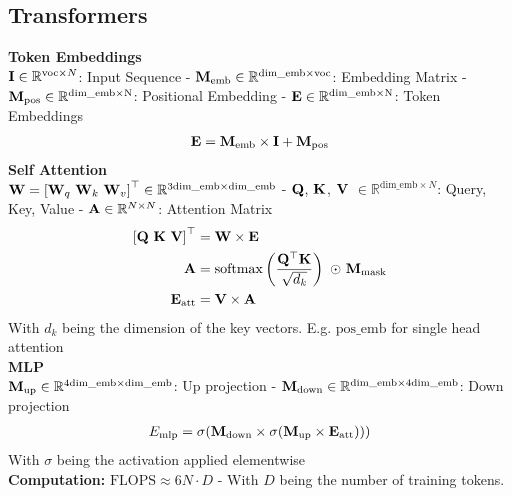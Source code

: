 \begin{multicols}{2}
    \section{Transformers}
    \begin{mdframed}[style=eqbox]
        \textbf{Token Embeddings}\\
        $\mathbf{I} \in \mathbb{R}^{\mathrm{voc}\times N}$: Input Sequence - $\mathbf{M_{\mathrm{emb}}} \in \mathbb{R}^{\mathrm{dim\_emb} \times \mathrm{voc}}$: Embedding Matrix - $\mathbf{M_{\mathrm{pos}}} \in \mathbb{R}^{\mathrm{dim\_emb} \times \mathrm{N}}$: Positional Embedding - $\mathbf{E} \in \mathbb{R}^{\mathrm{dim\_emb} \times \mathrm{N}}$: Token Embeddings
        \begin{align*}
            \mathbf{E} = \mathbf{M}_\mathrm{emb} \times \mathbf{I} + \mathbf{M}_\mathrm{pos}
        \end{align*}
        \textbf{Self Attention}\\
        $\mathbf{W} = \left[ \mathbf{W}_q ~ \mathbf{W}_k ~ \mathbf{W}_v \right]^\top \in \mathbb{R}^{3\mathrm{dim\_emb} \times \mathrm{dim\_emb}}$ - $\mathbf{Q}$, $\mathbf{K}$, $\mathbf{V}$ $\in \mathbb{R}^{\mathrm{dim\_emb} \times N}$: Query, Key, Value - $\mathbf{A} \in \mathbb{R}^{N \times N}$: Attention Matrix
        \begin{align*}
            \left[ \mat{Q} ~ \mat{K} ~ \mat{V} \right]^\top &= \mat{W} \times \mat{E}\\
            \mat{A} &= \operatorname{softmax}\left( \frac{\mat{Q}^\top \mat{K}}{\sqrt{d_k}}\right)~\astrosun~ \mat{M}_\mathrm{mask}\\
            \mat{E}_\mathrm{att} &= \mat{V} \times \mat{A}
        \end{align*}
        {\tiny With $d_k$ being the dimension of the key vectors. E.g. $\mathrm{pos\_emb}$ for single head attention}\\
        \textbf{MLP}\\
        $\mathbf{M}_\mathrm{up} \in \mathbb{R}^{4\mathrm{dim\_emb} \times \mathrm{dim\_emb}}$: Up projection - $\mathbf{M}_\mathrm{down} \in \mathbb{R}^{\mathrm{dim\_emb} \times 4\mathrm{dim\_emb}}$: Down projection
        \begin{align*}
            E_\mathrm{mlp} = \sigma(\mathbf{M}_\mathrm{down} \times \sigma (\mathbf{M}_\mathrm{up} \times \mathbf{E}_\mathrm{att})))
        \end{align*}
        {\tiny With $\sigma$ being the activation applied elementwise}\\
        \textbf{Computation:} $\mathrm{FLOPS} \approx 6N \cdot D$ - With $D$ being the number of training tokens.
    \end{mdframed}

\end{multicols}
